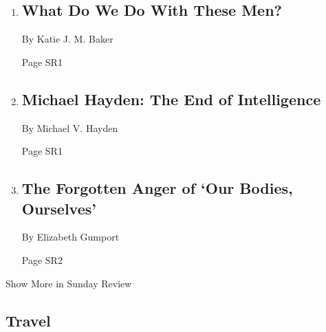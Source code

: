 \begin{enumerate}
\def\labelenumi{\arabic{enumi}.}
\item
  \href{/2018/04/27/opinion/sunday/metoo-comebacks-charlie-rose.html}{}

  \hypertarget{what-do-we-do-with-these-men}{%
  \subsection{What Do We Do With These
  Men?}\label{what-do-we-do-with-these-men}}

  By Katie J. M. Baker

  Page SR1
\item
  \href{/2018/04/28/opinion/sunday/the-end-of-intelligence.html}{}

  \hypertarget{michael-hayden-the-end-of-intelligence}{%
  \subsection{Michael Hayden: The End of
  Intelligence}\label{michael-hayden-the-end-of-intelligence}}

  By Michael V. Hayden

  Page SR1
\item
  \href{/2018/04/28/opinion/sunday/the-forgotten-anger-of-our-bodies-ourselves.html}{}

  \hypertarget{the-forgotten-anger-of-our-bodies-ourselves}{%
  \subsection{The Forgotten Anger of `Our Bodies,
  Ourselves'}\label{the-forgotten-anger-of-our-bodies-ourselves}}

  By Elizabeth Gumport

  Page SR2
\end{enumerate}

Show More in Sunday Review

\hypertarget{travel}{%
\subsection{Travel}\label{travel}}

